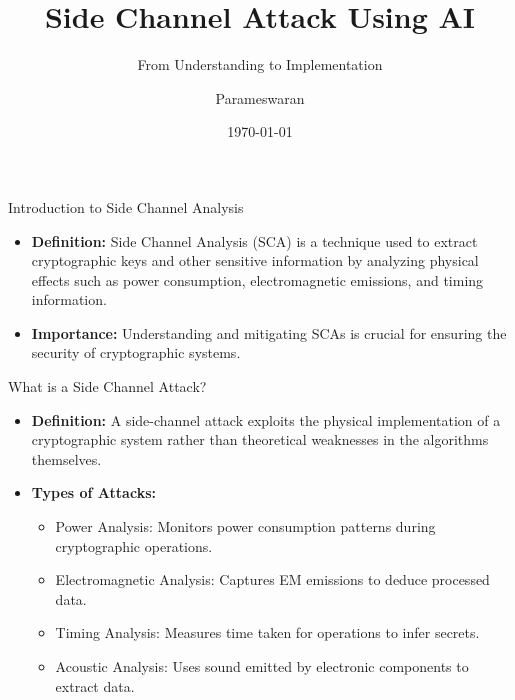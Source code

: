 \documentclass{beamer}
\title{Side Channel Attack Using AI}
\subtitle{From Understanding to Implementation}
\author{Parameswaran}
\date{\today}
\begin{document}
\frame{\titlepage}

\begin{frame}{Introduction to Side Channel Analysis}
    \begin{itemize}
        \item \textbf{Definition:} Side Channel Analysis (SCA) is a technique used to extract cryptographic keys and other sensitive information by analyzing physical effects such as power consumption, electromagnetic emissions, and timing information.
        \item \textbf{Importance:} Understanding and mitigating SCAs is crucial for ensuring the security of cryptographic systems.
    \end{itemize}
\end{frame}

\begin{frame}{What is a Side Channel Attack?}
    \begin{itemize}
        \item \textbf{Definition:} A side-channel attack exploits the physical implementation of a cryptographic system rather than theoretical weaknesses in the algorithms themselves.
        \item \textbf{Types of Attacks:}
        \begin{itemize}
            \item Power Analysis: Monitors power consumption patterns during cryptographic operations.
            \item Electromagnetic Analysis: Captures EM emissions to deduce processed data.
            \item Timing Analysis: Measures time taken for operations to infer secrets.
            \item Acoustic Analysis: Uses sound emitted by electronic components to extract data.
        \end{itemize}
    \end{itemize}
\end{frame}
\end{document}
